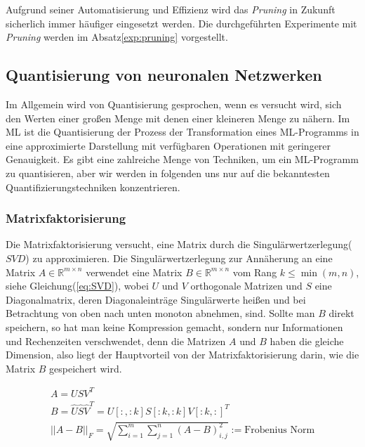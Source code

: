 \documentclass[12pt,a4paper]{scrartcl}
\numberwithin{equation}{section}
\newcommand{\R}{\mathbb{R}} %
\begin{document}
Aufgrund seiner Automatisierung und Effizienz wird das \textit{Pruning} in Zukunft sicherlich immer häufiger eingesetzt werden. Die durchgeführten Experimente mit \textit{Pruning} werden im Absatz\ref{exp:pruning} vorgestellt.


\subsection{ Quantisierung von neuronalen Netzwerken}
Im Allgemein wird von Quantisierung gesprochen, wenn es versucht wird, sich den Werten einer großen Menge mit denen einer kleineren Menge zu nähern. Im \ac{ML} ist die Quantisierung der Prozess der Transformation eines ML-Programms in eine approximierte Darstellung mit verfügbaren Operationen mit geringerer Genauigkeit.
Es gibt eine zahlreiche Menge von Techniken, um ein ML-Programm zu quantisieren, aber wir werden in folgenden uns nur auf die bekanntesten Quantifizierungstechniken konzentrieren.
\subsubsection{Matrixfaktorisierung}
Die Matrixfaktorisierung versucht, eine Matrix durch die Singulärwertzerlegung($ SVD $) zu approximieren.
Die Singulärwertzerlegung zur Annäherung an eine Matrix $ A \in \R^{m\times n} $ verwendet eine Matrix $ B \in \R^{m\times n}  $ vom Rang $ k \le \min(m, n) $, siehe Gleichung(\ref{eq:SVD}), wobei $ U $ und $ V $ orthogonale Matrizen und $ S $ eine Diagonalmatrix, deren Diagonaleinträge Singulärwerte heißen und bei Betrachtung von oben nach unten monoton abnehmen, sind. Sollte man $ B $ direkt speichern, so hat man keine Kompression gemacht, sondern nur Informationen und Rechenzeiten verschwendet, denn die Matrizen $ A $ und $ B $ haben die gleiche Dimension, also liegt der Hauptvorteil von der Matrixfaktorisierung darin, wie die Matrix $ B $ gespeichert wird.

\begin{equation}\label{eq:SVD}
	\begin{array}{l}
	A = USV^T\\
	B = \widehat{U}\widehat{S}\widehat{V}^T =  U[:,:k] S[:k,:k] V[:k, :]^T \\
	{||A - B||_F} = \sqrt{\sum_{i = 1}^{m} \sum_{j =1}^{n} (A-B)_{i,j}^2} := \text{Frobenius Norm}
	\end{array}	
\end{equation}
\end{document}
